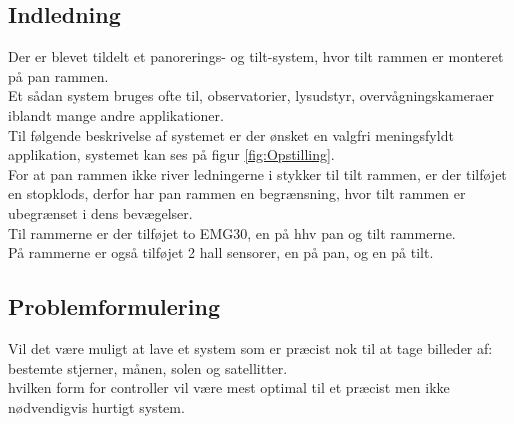 \subsection{Indledning}
Der er blevet tildelt et panorerings- og tilt-system, hvor tilt rammen er monteret på pan rammen.\\
Et sådan system bruges ofte til, observatorier, lysudstyr, overvågningskameraer iblandt mange andre applikationer.\\
Til følgende beskrivelse af systemet er der ønsket en valgfri meningsfyldt applikation, systemet kan ses på figur \ref{fig:Opstilling}.\\
For at pan rammen ikke river ledningerne i stykker til tilt rammen, er der tilføjet en stopklods, derfor har pan rammen en begrænsning, hvor tilt rammen er ubegrænset i dens bevægelser.\\
Til rammerne er der tilføjet to EMG30\cite{emg30Data}, en på hhv pan og tilt rammerne.\\
På rammerne er også tilføjet 2 hall sensorer, en på pan, og en på tilt. 



\subsection{Problemformulering}

Vil det være muligt at lave et system som er præcist nok til at tage billeder af: bestemte stjerner, månen, solen og satellitter.\\
hvilken form for controller vil være mest optimal til et præcist men ikke nødvendigvis hurtigt system.


